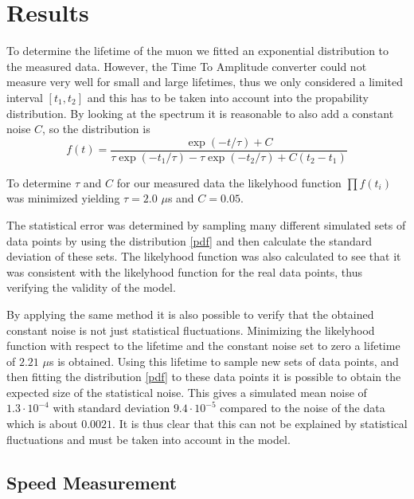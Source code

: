 \documentclass[10pt,twocolumn]{article}
\begin{document}
\section{Results}
To determine the lifetime of the muon we fitted an exponential distribution to the measured data. However, the Time To Amplitude converter could not measure very well for small and large lifetimes, thus we only considered a limited interval $[t_1,t_2]$ and this has to be taken into account into the propability distribution. By looking at the spectrum it is reasonable to also add a constant noise $C$, so the distribution is
\begin{equation}
f(t)=\frac{\exp{(-t/\tau)}+C}{\tau\exp{(-t_1/\tau)}-\tau\exp{(-t_2/\tau)}+C(t_2-t_1)}\label{pdf}
\end{equation}

To determine $\tau$ and $C$ for our measured data the likelyhood function $\prod f(t_i)$ was minimized yielding $\tau=2.0$ $\mu$s and $C=0.05$. \newline

The statistical error was determined by sampling many different simulated sets of data points by using the distribution \eqref{pdf} and then calculate the standard deviation of these sets. The likelyhood function was also calculated to see that it was consistent with the likelyhood function for the real data points, thus verifying the validity of the model. \newline

By applying the same method it is also possible to verify that the obtained constant noise is not just statistical fluctuations. Minimizing the likelyhood function with respect to the lifetime and the constant noise set to zero a lifetime of $2.21$ $\mu$s is obtained. Using this lifetime to sample new sets of data points, and then fitting the distribution \eqref{pdf} to these data points it is possible to obtain the expected size of the statistical noise. This gives a simulated mean noise of $1.3\cdot 10^{-4}$ with standard deviation $9.4\cdot 10^{-5}$ compared to the noise of the data which is about $0.0021$. It is thus clear that this can not be explained by statistical fluctuations and must be taken into account in the model.

\subsection{Speed Measurement}
\end{document}
